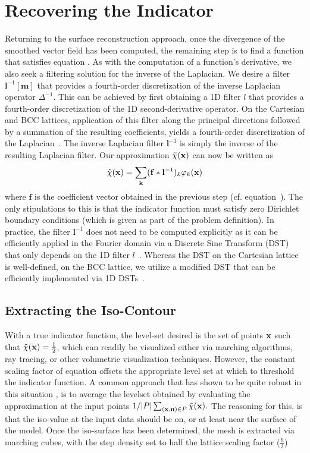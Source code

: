 \section{Recovering the Indicator}

\label{sec:recoveringX}
Returning to the surface reconstruction approach, once the divergence of the smoothed vector field has been computed, the remaining step is to find a function that satisfies equation . As with the computation of a function's derivative, we also seek a filtering solution for the inverse of the Laplacian. We desire a filter $\mathbf{l}^{-1}[\mathbf{m}]$ that provides a fourth-order discretization of the inverse Laplacian operator $\Delta^{-1}$. This can be achieved by first obtaining a 1D filter $l$ that provides a fourth-order discretization of the 1D second-derivative operator. On the Cartesian and BCC lattices, application of this filter along the principal directions followed by a summation of the resulting coefficients, yields a fourth-order discretization of the Laplacian~\cite{usmanthesis}. The inverse Laplacian filter $\mathbf{l}^{-1}$ is simply the inverse of the resulting Laplacian filter. Our approximation $\tilde{\chi}(\mathbf{x})$ can now be written as {\small
\begin{equation}
	\tilde{\chi}(\mathbf{x})  = \displaystyle\sum_{\mathbf{k}} (\mathbf{f} \ast \mathbf{l}^{-1})_k\varphi_k(\mathbf{x})
\end{equation}}
where $\mathbf{f}$ is the coefficient vector obtained in the previous step (cf. equation~). The only stipulations to this is that the indicator function must satisfy zero Dirichlet boundary conditions (which is given as part of the problem definition). In practice, the filter $\mathbf{l}^{-1}$ does not need to be computed explicitly as it can be efficiently applied in the Fourier domain via a Discrete Sine Transform (DST) that only depends on the 1D filter $l$~\cite[Chapter 4]{usmanthesis}. Whereas the DST on the Cartesian lattice is well-defined, on the BCC lattice, we utilize a  modified DST that can be efficiently implemented via 1D DSTs~\cite{bccdst}. 

\subsection{Extracting the Iso-Contour}\label{sec:levelset}
With a true indicator function, the level-set desired is the set of points $\mathbf{x}$ such that $\tilde{\chi}(\mathbf{x}) = \frac{1}{2}$, which can readily be visualized either via marching algorithms, ray tracing, or other volumetric visualization techniques. However, the constant scaling factor of equation  offsets the appropriate level set at which to threshold the indicator function. A common approach that has shown to be quite robust in this situation \cite{fftk}, is to average the levelset obtained by evaluating the approximation at the input points ${1}/{|P|}\sum_{(\mathbf{x},\mathbf{n})\in P}{\tilde{\chi}(\mathbf{x})}.$ The reasoning for this, is that the iso-value at the input data should be on, or at least near the surface of the model. Once the iso-surface has been determined, the mesh is extracted via marching cubes, with the step density set to half the lattice scaling factor ($\frac{h}{2}$) %
